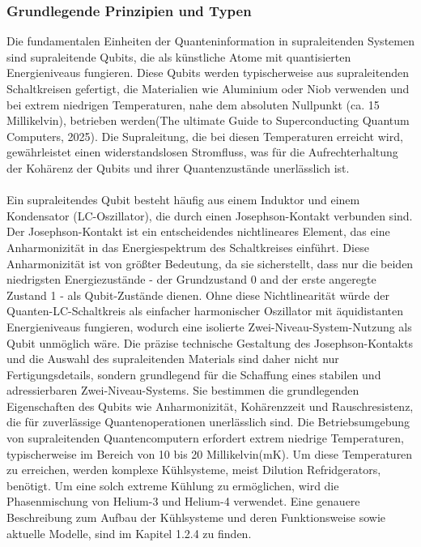 \subsubsection{Grundlegende Prinzipien und Typen}
Die fundamentalen Einheiten der Quanteninformation in supraleitenden Systemen sind supraleitende Qubits, die als künstliche Atome mit quantisierten Energieniveaus fungieren. Diese Qubits werden typischerweise aus supraleitenden Schaltkreisen gefertigt, die Materialien wie Aluminium oder Niob verwenden und bei extrem niedrigen Temperaturen, nahe dem absoluten Nullpunkt (ca. 15 Millikelvin), betrieben werden(The ultimate Guide to Superconducting Quantum Computers, 2025). Die Supraleitung, die bei diesen Temperaturen erreicht wird, gewährleistet einen widerstandslosen Stromfluss, was für die Aufrechterhaltung der Kohärenz der Qubits und ihrer Quantenzustände unerlässlich ist.
\\\\
Ein supraleitendes Qubit besteht häufig aus einem Induktor und einem Kondensator (LC-Oszillator), die durch einen Josephson-Kontakt verbunden sind. Der Josephson-Kontakt ist ein entscheidendes nichtlineares Element, das eine Anharmonizität in das Energiespektrum des Schaltkreises einführt. Diese Anharmonizität ist von größter Bedeutung, da sie sicherstellt, dass nur die beiden niedrigsten Energiezustände - der Grundzustand 0 and der erste angeregte Zustand 1 - als Qubit-Zustände dienen. Ohne diese Nichtlinearität würde der Quanten-LC-Schaltkreis als einfacher harmonischer Oszillator mit äquidistanten Energieniveaus fungieren, wodurch eine isolierte Zwei-Niveau-System-Nutzung als Qubit unmöglich wäre. Die präzise technische Gestaltung des Josephson-Kontakts und die Auswahl des supraleitenden Materials sind daher nicht nur Fertigungsdetails, sondern grundlegend für die Schaffung eines stabilen und adressierbaren Zwei-Niveau-Systems. Sie bestimmen die grundlegenden Eigenschaften des Qubits wie Anharmonizität, Kohärenzzeit und Rauschresistenz, die für zuverlässige Quantenoperationen unerlässlich sind. Die Betriebsumgebung von supraleitenden Quantencomputern erfordert extrem niedrige Temperaturen, typischerweise im Bereich von 10 bis 20 Millikelvin(mK). Um diese Temperaturen zu erreichen, werden komplexe Kühlsysteme, meist Dilution Refridgerators, benötigt. Um eine solch extreme Kühlung zu ermöglichen, wird die Phasenmischung von Helium-3 und Helium-4 verwendet. Eine genauere Beschreibung zum Aufbau der Kühlsysteme und deren Funktionsweise sowie aktuelle Modelle, sind im Kapitel 1.2.4 zu finden.
\\\\
